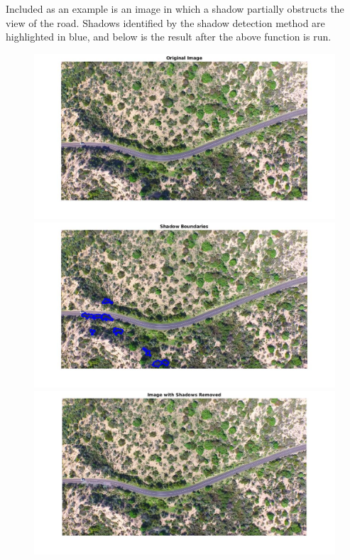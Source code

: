 \documentclass[12pt]{article}
\begin{document}
\begin{enumerate}
Included as an example is an image in which a shadow partially obstructs the view of the road. Shadows identified by the shadow detection method are highlighted in blue, and below is the result after the above function is run.

\begin{figure}[H]
	\centering
	\includegraphics[scale = 0.3]{singleroad1.jpg}
	\includegraphics[scale = 0.3]{shadowBoundaries.jpg}
	\includegraphics[scale = 0.3]{shadowFixed.jpg}
\end{figure}


\end{enumerate}
\end{document}
